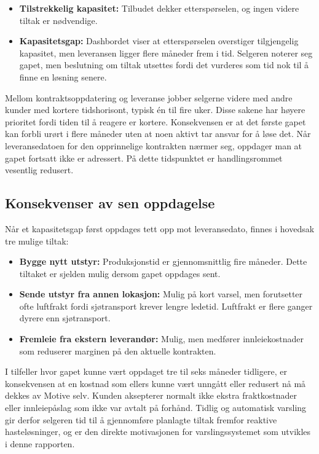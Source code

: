 \documentclass[a4paper,11pt]{article}
\begin{document}
\begin{itemize}
\item \textbf{Tilstrekkelig kapasitet:} Tilbudet dekker etterspørselen, og ingen videre tiltak er nødvendige.
\item \textbf{Kapasitetsgap:} Dashbordet viser at etterspørselen overstiger tilgjengelig kapasitet, men leveransen ligger flere måneder frem i tid. Selgeren noterer seg gapet, men beslutning om tiltak utsettes fordi det vurderes som tid nok til å finne en løsning senere.
\end{itemize}

Mellom kontraktsoppdatering og leveranse jobber selgerne videre med andre kunder med kortere tidshorisont, typisk én til fire uker. Disse sakene har høyere prioritet fordi tiden til å reagere er kortere. Konsekvensen er at det første gapet kan forbli urørt i flere måneder uten at noen aktivt tar ansvar for å løse det. Når leveransedatoen for den opprinnelige kontrakten nærmer seg, oppdager man at gapet fortsatt ikke er adressert. På dette tidspunktet er handlingsrommet vesentlig redusert.

\subsection{Konsekvenser av sen oppdagelse}

Når et kapasitetsgap først oppdages tett opp mot leveransedato, finnes i hovedsak tre mulige tiltak:

\begin{itemize}
\item \textbf{Bygge nytt utstyr:} Produksjonstid er gjennomsnittlig fire måneder. Dette tiltaket er sjelden mulig dersom gapet oppdages sent.
\item \textbf{Sende utstyr fra annen lokasjon:} Mulig på kort varsel, men forutsetter ofte luftfrakt fordi sjøtransport krever lengre ledetid. Luftfrakt er flere ganger dyrere enn sjøtransport.
\item \textbf{Fremleie fra ekstern leverandør:} Mulig, men medfører innleiekostnader som reduserer marginen på den aktuelle kontrakten.
\end{itemize}

I tilfeller hvor gapet kunne vært oppdaget tre til seks måneder tidligere, er konsekvensen at en kostnad som ellers kunne vært unngått eller redusert nå må dekkes av Motive selv. Kunden aksepterer normalt ikke ekstra fraktkostnader eller innleiepåslag som ikke var avtalt på forhånd. Tidlig og automatisk varsling gir derfor selgeren tid til å gjennomføre planlagte tiltak fremfor reaktive hasteløsninger, og er den direkte motivasjonen for varslingssystemet som utvikles i denne rapporten.
\end{document}
